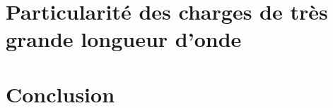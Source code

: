\documentclass[9pt]{beamer}
\newenvironment{workblock}[1]{%
  \setbeamercolor{block body}{bg=green!10}
\begin{block}{#1}}{\end{block}}
\begin{document}


\section[Particularité des charges de...]{Particularité des charges de très grande longueur d'onde}


\section*{Conclusion}
\end{document}

